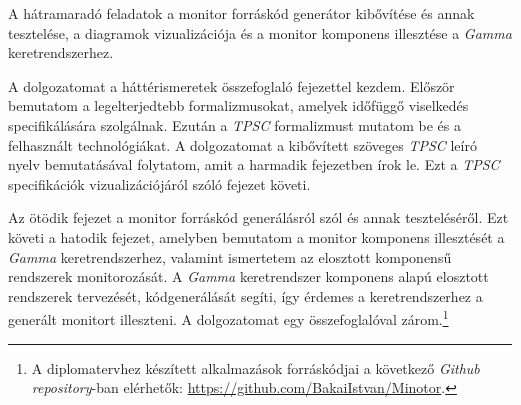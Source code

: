 A hátramaradó feladatok a monitor forráskód generátor kibővítése és annak tesztelése, a diagramok vizualizációja és a monitor komponens illesztése a \textit{Gamma} keretrendszerhez.

A dolgozatomat a háttérismeretek összefoglaló fejezettel kezdem.
Először bemutatom a legelterjedtebb formalizmusokat, amelyek időfüggő viselkedés specifikálására szolgálnak.
Ezután a \textit{TPSC} formalizmust mutatom be és a felhasznált technológiákat.
A dolgozatomat a kibővített szöveges \textit{TPSC} leíró nyelv bemutatásával folytatom, amit a harmadik fejezetben írok le.
Ezt a \textit{TPSC} specifikációk vizualizációjáról szóló fejezet követi.

Az ötödik fejezet a monitor forráskód generálásról szól és annak teszteléséről.
Ezt követi a hatodik fejezet, amelyben bemutatom a monitor komponens illesztését a \textit{Gamma} keretrendszerhez, valamint ismertetem az elosztott komponensű rendszerek monitorozását.
A \textit{Gamma} keretrendszer komponens alapú elosztott rendszerek tervezését, kódgenerálását segíti, így érdemes a keretrendszerhez a generált monitort illeszteni.
A dolgozatomat egy összefoglalóval zárom.\footnote{A diplomatervhez készített alkalmazások forráskódjai a következő \textit{Github} \textit{repository}-ban elérhetők:
\url{https://github.com/BakaiIstvan/Minotor}.}